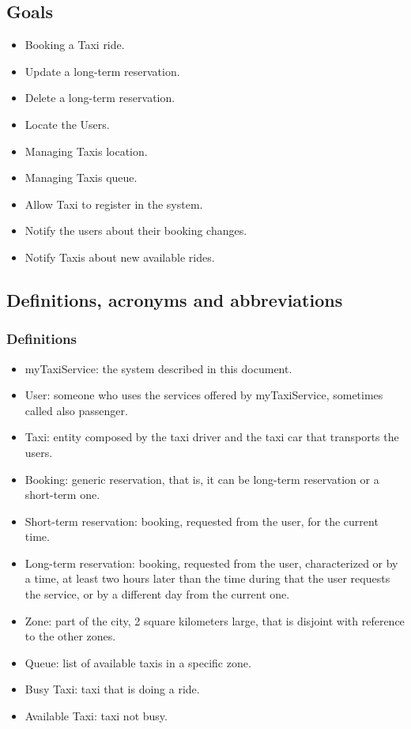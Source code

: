 	\subsection{Goals}
	\begin{itemize}
		\item Booking a Taxi ride.
		\item Update a long-term reservation.
		\item Delete a long-term reservation.
		\item Locate the Users.
		\item Managing Taxis location.
		\item Managing Taxis queue.
		\item Allow Taxi to register in the system.
		\item Notify the users about their booking changes.
		\item Notify Taxis about new available rides.
	\end{itemize}
	
	\subsection{Definitions, acronyms and abbreviations}
		\subsubsection{Definitions}
		\begin{itemize}
			\item myTaxiService: the system described in this document.
			\item User: someone who uses the services offered by myTaxiService, sometimes called also passenger.
			\item Taxi: entity composed by the taxi driver and the taxi car that transports the users.
			\item Booking: generic reservation, that is, it can be long-term reservation or a short-term one.
			\item Short-term reservation: booking, requested from the user, for the current time.
			\item Long-term reservation: booking, requested from the user, characterized or by a time, at least two hours later than the time during that the user requests the service, or by a different day from the current one.
			\item Zone: part of the city, 2 square kilometers large, that is disjoint with reference to the other zones.
			\item Queue: list of available taxis in a specific zone.
			\item Busy Taxi: taxi that is doing a ride.
			\item Available Taxi: taxi not busy.
		\end{itemize}
